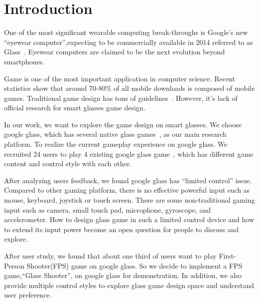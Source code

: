 \documentclass{sigchi}
\begin{document}
\section{Introduction}
One of the most significant wearable computing break-throughs is Google's new ``eyewear computer'',expecting to be commercially available in 2014 referred to as Glass~\cite{glass}.
Eyewear computers are claimed to be the next evolution beyond smartphones. 

Game is one of the most important application in computer science. Recent statistics show that around 70-80\% of all mobile downloads is composed of mobile games\cite{statistics,infographic}. Traditional game design has tons of guidelines~\cite{videogame,mobilegame,bodygame,gameflow,argame,wearable}. However, it's lack of official research for smart glasses game design.

In our work, we want to explore the game design on smart glasses. We choose google glass, which has  several native glass games~\cite{minigame}, as our main research platform. To realize the current gameplay experience on google glass. We recruited 24 users to play 4 existing google glass game~\cite{minigame}, which has different game content and control style with each other. 

After analyzing users feedback, we found google glass has ``limited control'' issue. Compared to other gaming platform, there is no effective powerful input such as mouse, keyboard, joystick or touch screen. There are some non-traditional gaming input such as camera, small touch pad, microphone, gyroscope, and accelerometer. How to design glass game in such a limited control device and how to extend its input power become an open question for people to discuss and explore.

After user study, we found that about one third of users want to play First-Person Shooter(FPS) game on google glass. So we decide to implement a FPS game,``Glass Shooter'', on google glass for demonstration. In addition, we also provide multiple control styles to explore glass game design space and understand user preference.

\end{document}
